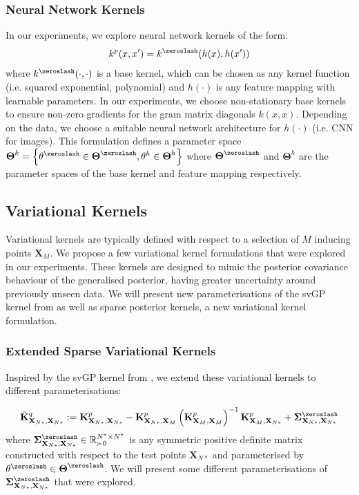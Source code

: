 \documentclass{article}
\numberwithin{equation}{section}
\begin{document}
\subsubsection{Neural Network Kernels}
In our experiments, we explore neural network kernels of the form:
\begin{align}
    k^p(x, x') = k^{\zeroslash}(h(x), h(x'))
\end{align}
where $k^{\zeroslash}(\cdot, \cdot)$ is a base kernel, which can be chosen as any kernel function (i.e. squared exponential, polynomial) and $h(\cdot)$ is any feature mapping with learnable parameters. In our experiments, we choose non-stationary base kernels to ensure non-zero gradients for the gram matrix diagonals $k(x, x)$. Depending on the data, we choose a suitable neural network architecture for $h(\cdot)$ (i.e. CNN for images). This formulation defines a parameter space $\boldsymbol{\Theta}^k = \left\{\theta^{\zeroslash} \in \boldsymbol{\Theta}^{\zeroslash}, \theta^h \in \boldsymbol{\Theta}^h\right\}$ where $\boldsymbol{\Theta}^{\zeroslash}$ and $\boldsymbol{\Theta}^h$ are the parameter spaces of the base kernel and feature mapping respectively.

\subsection{Variational Kernels}
Variational kernels are typically defined with respect to a selection of $M$ inducing points $\mathbf{X}_M$. We propose a few variational kernel formulations that were explored in our experiments. These kernels are designed to mimic the posterior covariance behaviour of the generalised posterior, having greater uncertainty around previously unseen data. We will present new parameterisations of the svGP kernel from \cite{titsias2009variational} as well as sparse posterior kernels, a new variational kernel formulation.

\subsubsection{Extended Sparse Variational Kernels}
Inspired by the svGP kernel from \cite{titsias2009variational}, we extend these variational kernels to different parameterisations:

\begin{align}
            \bar{\mathbf{K}}^q_{\mathbf{X}_{N*}, \mathbf{X}_{N*}} := \mathbf{K}^p_{\mathbf{X}_{N*}, \mathbf{X}_{N*}} - \mathbf{K}^p_{\mathbf{X}_{N*}, \mathbf{X}_M}\left(\mathbf{K}^p_{\mathbf{X}_{M}, \mathbf{X}_M}\right)^{-1}\mathbf{K}^p_{\mathbf{X}_M, \mathbf{X}_{N*}} + \mathbf{\Sigma}^{\zeroslash}_{\mathbf{X}_{N*}, \mathbf{X}_{N*}} 
\end{align}
where $\mathbf{\Sigma}^{\zeroslash}_{\mathbf{X}_{N*}, \mathbf{X}_{N*}} \in \mathbb{R}^{N^*\times N^*}_{\succ 0}$ is any symmetric positive definite matrix constructed with respect to the test points $\mathbf{X}_{N*}$ and parameterised by $\theta^{\zeroslash} \in \boldsymbol{\Theta}^{\zeroslash}$. We will present some different parameterisations of $\mathbf{\Sigma}^{\zeroslash}_{\mathbf{X}_{N*}, \mathbf{X}_{N*}}$ that were explored.
\end{document}
